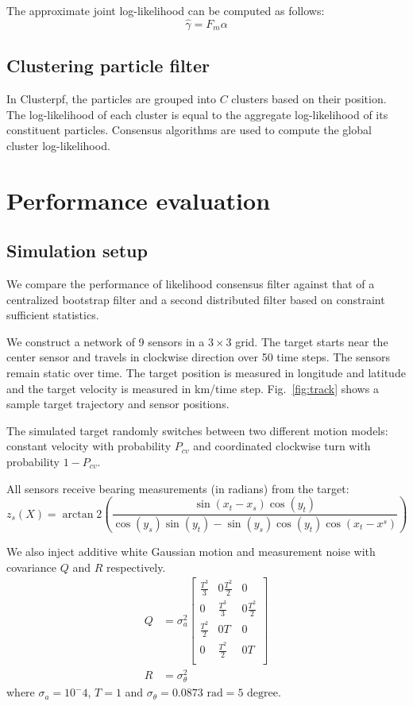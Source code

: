 \documentclass[10pt,letterpaper,final]{article}
\begin{document}
The approximate joint log-likelihood can be computed as follows:
\begin{equation}
\hat{\gamma} = F_m\alpha
\end{equation}

\subsection{Clustering particle filter}
In Clusterpf, the particles are grouped into $C$ clusters based on their position. The log-likelihood of each cluster is equal to the aggregate log-likelihood of its constituent particles. Consensus algorithms are used to compute the global 
cluster log-likelihood. 

\section{Performance evaluation}
\subsection{Simulation setup}
We compare the performance of likelihood consensus filter against that of a centralized bootstrap filter and a second distributed filter based on constraint sufficient statistics. 

We construct a network of 9 sensors in a $3\times 3$ grid. The target starts near the center sensor and travels in clockwise direction over 50 time steps. The sensors remain static over time. The target position is measured in longitude and latitude and the target velocity is measured in km/time step. Fig.~\ref{fig:track} shows a sample target trajectory and sensor positions. 

The simulated target randomly switches between two different motion models: constant velocity with probability $P_{cv}$ and coordinated clockwise turn with probability $1-P_{cv}$. 

All sensors receive bearing measurements (in radians) from the target:
\begin{equation}
z_s(X) = \arctan2 \left( \frac{\sin(x_t-x_s)\cos(y_t)}{\cos(y_s)\sin(y_t)-\sin(y_s)\cos(y_t)\cos(x_t-x^s)}  \right)
\label{eqn:bearing}
\end{equation}

We also inject additive white Gaussian motion and measurement noise with covariance $Q$ and $R$ respectively.
\begin{align}
Q &= \sigma_a^2
\left[
\begin{array}{cccc}
\frac{T^3}{3} & 0 \frac{T^2}{2} & 0 \\
0 & \frac{T^3}{3} & 0 \frac{T^2}{2} \\
\frac{T^2}{2} & 0 T & 0 \\
0 & \frac{T^2}{2} & 0 T \\
\end{array}
\right]\\
R &= \sigma_{\theta}^2
\end{align}
where $\sigma_a=10^-4$, $T=1$ and $\sigma_{\theta}=0.0873\text{ rad} = 5 \text{ degree}$.
\end{document}
